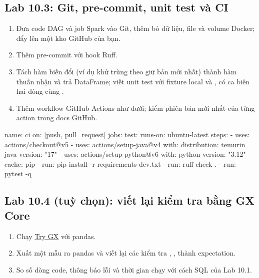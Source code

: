 \subsection{Lab 10.3: Git, pre-commit, unit test và CI}
\begin{enumerate}
  \item Đưa code DAG và job Spark vào Git, thêm  bỏ dữ liệu, file  và volume Docker; đẩy lên một kho GitHub của bạn.
  \item Thêm pre-commit với hook Ruff.
  \item Tách hàm biến đổi (ví dụ khử trùng theo  giữ bản  mới nhất) thành hàm thuần nhận và trả DataFrame; viết unit test với fixture  local và , có ca biên hai dòng cùng .
  \item Thêm workflow GitHub Actions như dưới; kiểm phiên bản mới nhất của từng action trong docs GitHub.
\end{enumerate}
\begin{codeblock}
name: ci
on: [push, pull_request]
jobs:
  test:
    runs-on: ubuntu-latest
    steps:
      - uses: actions/checkout@v5
      - uses: actions/setup-java@v4
        with:
          distribution: temurin
          java-version: "17"
      - uses: actions/setup-python@v6
        with:
          python-version: "3.12"
          cache: pip
      - run: pip install -r requirements-dev.txt
      - run: ruff check .
      - run: pytest -q
\end{codeblock}

\subsection{Lab 10.4 (tuỳ chọn): viết lại kiểm tra bằng GX Core}
\begin{enumerate}
  \item Chạy \href{https://docs.greatexpectations.io/docs/core/introduction/try_gx/}{Try GX} với pandas.
  \item Xuất một mẫu  ra pandas và viết lại các kiểm tra , ,  thành expectation.
  \item So số dòng code, thông báo lỗi và thời gian chạy với cách SQL của Lab 10.1.
\end{enumerate}

